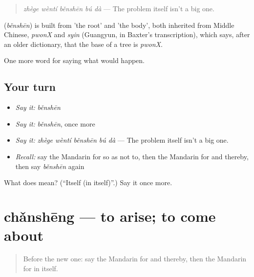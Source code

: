 \begin{quote}
\textbf{} \emph{zhège wèntí běnshēn bú dà} — The problem itself isn't a big one.
\end{quote}

\begin{cousinweb}
\textbf{} (\emph{běnshēn}) is built from  'the root' and  'the body', both inherited from Middle Chinese, \emph{pwonX} and \emph{syin} (Guangyun, in Baxter's transcription), which says, after an older dictionary, that the base of a tree is \emph{pwonX}.
\end{cousinweb}

\begin{grammarlens}[title={What you've built}]
One more word for saying what would happen.
\end{grammarlens}

\subsection*{Your turn}
\begin{itemize}
\raggedright
  \item \emph{Say it:} \emph{běnshēn}
  \item \emph{Say it:} \emph{běnshēn}, once more
  \item \emph{Say it:} \emph{zhège wèntí běnshēn bú dà} — The problem itself isn't a big one.
  \item \emph{Recall:} say the Mandarin for so as not to, then the Mandarin for and thereby, then say \emph{běnshēn} again
\end{itemize}

\begin{tcolorbox}[breakable,colback=teal!4,colframe=teal!35!black,title={Before you move on}]
What does  mean? (\textquotedblleft{}Itself (in itself)\textquotedblright{}.) Say it once more.
\end{tcolorbox}
\section[chǎnshēng]{chǎnshēng — to arise; to come about}

\label{lesson:ZH-C538-chansheng}



\begin{quote}
Before the new one: say the Mandarin for and thereby, then the Mandarin for in itself.
\end{quote}

